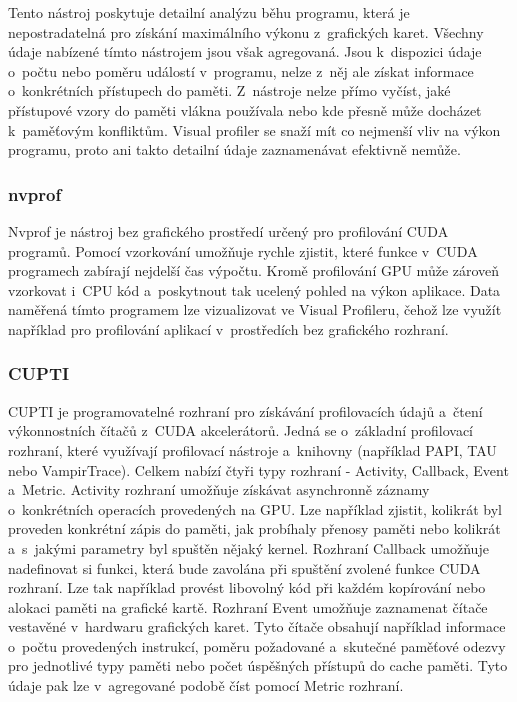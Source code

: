 Tento nástroj poskytuje detailní analýzu běhu programu, která je nepostradatelná pro získání maximálního výkonu z~grafických karet. Všechny údaje nabízené tímto nástrojem jsou však agregovaná. Jsou k~dispozici údaje o~počtu nebo poměru událostí v~programu, nelze z~něj ale získat informace o~konkrétních přístupech do paměti. Z~nástroje nelze přímo vyčíst, jaké přístupové vzory do paměti vlákna používala nebo kde přesně může docházet k~paměťovým konfliktům. 
Visual profiler se snaží mít co nejmenší vliv na výkon programu, proto ani takto detailní údaje zaznamenávat efektivně nemůže.


\subsubsection{nvprof}
Nvprof je nástroj bez grafického prostředí určený pro profilování CUDA programů. Pomocí vzorkování umožňuje rychle zjistit, které funkce v~CUDA programech zabírají nejdelší čas výpočtu. Kromě profilování GPU může zároveň vzorkovat i~CPU kód a~poskytnout tak ucelený pohled na výkon aplikace. Data naměřená tímto programem lze vizualizovat ve Visual Profileru, čehož lze využít například pro profilování aplikací v~prostředích bez grafického rozhraní. 

\subsubsection{CUPTI}
CUPTI je programovatelné rozhraní pro získávání profilovacích údajů a~čtení výkonnostních čítačů z~CUDA akcelerátorů. Jedná se o~základní profilovací rozhraní, které využívají profilovací nástroje a~knihovny (například PAPI, TAU nebo VampirTrace).
Celkem nabízí čtyři typy rozhraní - Activity, Callback, Event a~Metric. Activity rozhraní umožňuje získávat asynchronně záznamy o~konkrétních operacích provedených na GPU. Lze například zjistit, kolikrát byl proveden konkrétní zápis do paměti, jak probíhaly přenosy paměti nebo kolikrát a~s~jakými parametry byl spuštěn nějaký kernel. Rozhraní Callback umožňuje nadefinovat si funkci, která bude zavolána při spuštění zvolené funkce CUDA rozhraní. Lze tak například provést libovolný kód při každém kopírování nebo alokaci paměti na grafické kartě. Rozhraní Event umožňuje zaznamenat čítače vestavěné v~hardwaru grafických karet. Tyto čítače obsahují například informace o~počtu provedených instrukcí, poměru požadované a~skutečné paměťové odezvy pro jednotlivé typy paměti nebo počet úspěšných přístupů do cache paměti. Tyto údaje pak lze v~agregované podobě číst pomocí Metric rozhraní.

